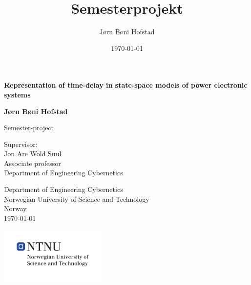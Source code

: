 \documentclass[10pt,b5paper,twoside,openright, english]{book}
\title{Semesterprojekt}
\author{Jørn Bøni Hofstad}
\date{\today}
\begin{document}
\begin{titlepage}
    \begin{center}
        \vspace*{1cm}
        \Large
        \textbf{Representation of time-delay in state-space models of power electronic systems}
  
        \vspace{0.5cm}
        
        \normalsize
        \textbf{Jørn Bøni Hofstad}
        \vspace{1.5cm}
        
        Semester-project
        \vspace{1.8cm}

        Supervisor:\\
        Jon Are Wold Suul\\
        Associate professor\\
        Department of Engineering Cybernetics
  
        \vfill
  
  
        \vspace{0.8cm}
  
        
        Department of Engineering Cybernetics\\
        Norwegian University of Science and Technology \\
        Norway\\
        \today

        \includegraphics[width=0.4\textwidth]{Figures/university.pdf}
  
    \end{center}
 \end{titlepage}

\frontmatter
\tableofcontents
\printglossary[type=\acronymtype,title={List of Acronyms}]{}
\printglossary[title={List of symbols}]{}



\mainmatter








\appendix




\printbibliography
\end{document}
